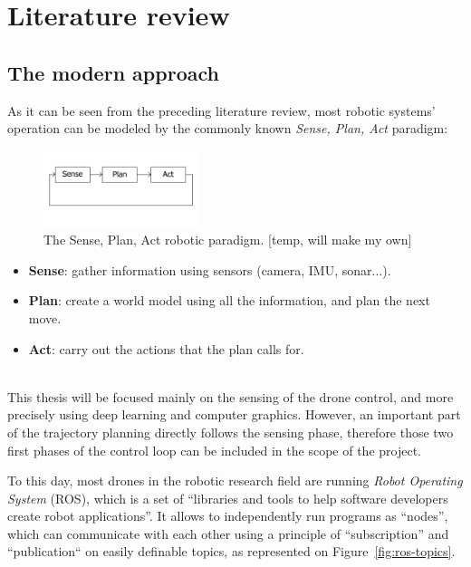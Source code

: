 \section{Literature review}


\subsection{The modern approach}
As it can be seen from the preceding literature review, most robotic systems'
operation can be modeled by the commonly known \emph{Sense, Plan, Act}
paradigm:

\begin{figure}[h]
	\centering
	\includegraphics[width=0.4\textwidth]{figure/robotic_paradigm.png}
	\caption{The Sense, Plan, Act robotic paradigm. [temp, will make my own]}
	\label{fig:robotic_paradigm}
\end{figure}

\begin{itemize}
	\item{\textbf{Sense}}: gather information using sensors (camera, IMU, sonar...).
	\item{\textbf{Plan}}: create a world model using all the information, and plan
		the next move.
	\item{\textbf{Act}}: carry out the actions that the plan calls for.
\end{itemize}

~\\
This thesis will be focused mainly on the sensing of the drone control, and
more precisely using deep learning and computer graphics. However, an important
part of the trajectory planning directly follows the sensing phase, therefore
those two first phases of the control loop can be included in the scope of the
project.

To this day, most drones in the robotic research field are running \emph{Robot
Operating System} (ROS),  which is a set of ``libraries and
tools to help software developers create robot applications''. It allows to
independently run programs as ``nodes'', which can communicate with each other
using a principle of ``subscription'' and ``publication`` on easily definable
topics, as represented on Figure~\ref{fig:ros-topics}.


